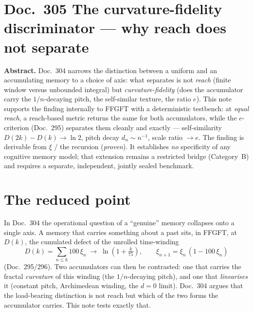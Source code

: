 
\section*{Doc.~305 \quad The curvature-fidelity discriminator --- why reach does not separate}

\begingroup\small\noindent
\textbf{Abstract.} Doc.~304 narrows the distinction between a uniform and an accumulating memory
to a choice of axis: what separates is not \emph{reach} (finite window versus unbounded
integral) but \emph{curvature-fidelity} (does the accumulator carry the $1/n$-decaying pitch,
the self-similar texture, the ratio $e$). This note supports the finding internally to FFGFT
with a deterministic testbench: at \emph{equal reach}, a reach-based metric returns the same for
both accumulators, while the $e$-criterion (Doc.~295) separates them cleanly and exactly ---
self-similarity $D(2k)-D(k)\to\ln 2$, pitch decay $d_n\sim n^{-1}$, scale ratio $\to e$. The
finding is derivable from $\xi$ / the recursion (\emph{proven}). It establishes \emph{no}
specificity of any cognitive memory model; that extension remains a restricted bridge
(Category~B) and requires a separate, independent, jointly sealed benchmark.
\par\endgroup

\medskip

\section{The reduced point}

In Doc.~304 the operational question of a \enquote{genuine} memory collapses onto a single
axis. A memory that carries something about a past sits, in FFGFT, at $D(k)$, the cumulated
defect of the unrolled time-winding
\begin{equation}
D(k) = \sum_{n\le k} 100\,\xi_n \;\to\; \ln\!\left(1+\tfrac{k}{75}\right),
\qquad \xi_{n+1}=\xi_n\,(1-100\,\xi_n)
\end{equation}
(Doc.~295/296). Two accumulators can then be contrasted: one that carries the fractal
\emph{curvature} of this winding (the $1/n$-decaying pitch), and one that \emph{linearises} it
(constant pitch, Archimedean winding, the $d=0$ limit). Doc.~304 argues that the load-bearing
distinction is not reach but which of the two forms the accumulator carries. This note tests
exactly that.

